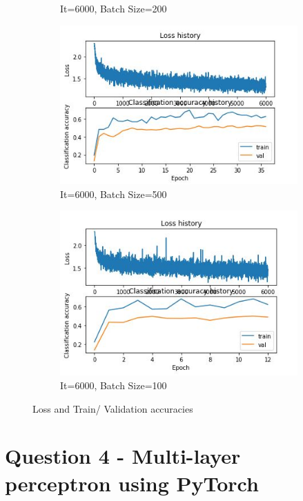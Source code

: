 \documentclass[
	12pt, %
]{fphw}
\begin{document}
\begin{figure}[h!]
\begin{subfigure}[b]{0.2\textwidth}
         \caption{It=6000, Batch Size=200}
     \end{subfigure}
      \hfill
     \begin{subfigure}[b]{0.2\textwidth}
         \centering
         \includegraphics[width=\textwidth]{img/Img_11.JPG}
         \caption{It=6000, Batch Size=500}
     \end{subfigure}
      \hfill
     \begin{subfigure}[b]{0.2\textwidth}
         \centering
         \includegraphics[width=\textwidth]{img/Img_12.JPG}
         \caption{It=6000, Batch Size=100}
     \end{subfigure}
        \caption{Loss and Train/ Validation accuracies}
        \label{fig:three graphs}
\end{figure}
\newpage
\section*{Question 4 - Multi-layer perceptron using PyTorch}
\end{document}
